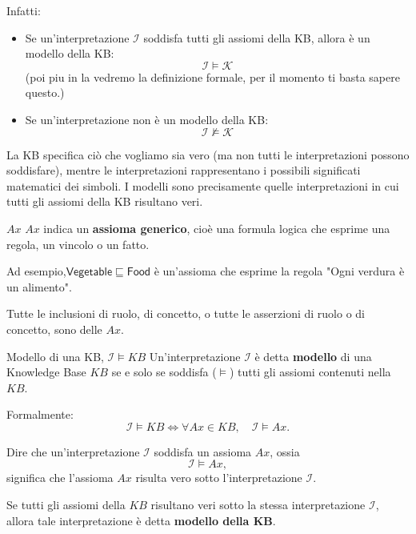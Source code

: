 Infatti:
\begin{itemize}
    \item Se un'interpretazione \(\mathcal I\) soddisfa tutti gli assiomi della KB, allora è un modello della KB:
    \[
    \mathcal I\models\mathcal K
    \]
    (poi piu in la vedremo la definizione formale, per il momento ti basta sapere questo.)
    \item Se un'interpretazione non è un modello della KB:
    \[
\mathcal I\not\models\mathcal K
    \]
\end{itemize}
La KB specifica ciò che vogliamo sia vero (ma non tutti le interpretazioni possono soddisfare), mentre le interpretazioni rappresentano i possibili significati matematici dei simboli. I modelli sono precisamente quelle interpretazioni in cui tutti gli assiomi della KB risultano veri.

\begin{definition}{$Ax$}
    $Ax$ indica un \textbf{assioma generico}, cioè una formula logica che esprime una regola, un vincolo o un fatto.

    Ad esempio,$\mathsf{Vegetable}\sqsubseteq\mathsf{Food}$ è un'assioma che esprime la regola "Ogni verdura è un alimento".

    Tutte le inclusioni di ruolo, di concetto, o tutte le asserzioni di ruolo o di concetto, sono delle $Ax$.
\end{definition}


\begin{definition}{Modello di una KB, $\mathcal{I} \models KB$}
    Un'interpretazione $\mathcal{I}$ è detta \textbf{modello} di una
    Knowledge Base $KB$ se e solo se soddisfa ($\models$) tutti gli assiomi
    contenuti nella $KB$.

    Formalmente:
    \[
        \mathcal{I} \models KB
        \iff
        \forall Ax \in KB, \quad \mathcal{I} \models Ax.
    \]
\end{definition}


\begin{observation}{}
    Dire che un'interpretazione $\mathcal{I}$ soddisfa un assioma
    $Ax$, ossia
    \[
        \mathcal{I} \models Ax,
    \]
    significa che l'assioma $Ax$ risulta vero sotto l'interpretazione
    $\mathcal{I}$.

    Se tutti gli assiomi della $KB$ risultano veri sotto la stessa
    interpretazione $\mathcal{I}$, allora tale interpretazione
    è detta \textbf{modello della KB}.
\end{observation}


